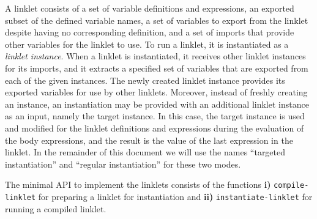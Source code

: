 A linklet consists of a set of variable definitions and expressions,
an exported subset of the defined variable names, a set of variables
to export from the linklet despite having no corresponding definition,
and a set of imports that provide other variables for the linklet to
use. To run a linklet, it is instantiated as a \emph{linklet
instance}. When a linklet is instantiated, it receives other linklet
instances for its imports, and it extracts a specified set of
variables that are exported from each of the given instances. The
newly created linklet instance provides its exported variables for use
by other linklets. Moreover, instead of freshly creating an instance,
an instantiation may be provided with an additional linklet instance
as an input, namely the target instance. In this case, the target
instance is used and modified for the linklet definitions and
expressions during the evaluation of the body expressions, and the
result is the value of the last expression in the linklet. In the
remainder of this document we will use the names ``targeted
instantiation'' and ``regular instantiation'' for these two modes.

The minimal API to implement the linklets consists of the functions
\textbf{i)} \verb|compile-linklet| for preparing a linklet for
instantiation and \textbf{ii)} \verb|instantiate-linklet| for running
a compiled linklet.

